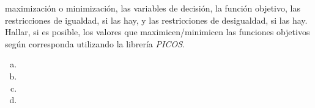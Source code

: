 \documentclass[12pt]{article}
\begin{document}
\begin{center}
\begin{enumerate}
            maximización o minimización, las variables de decisión, la función objetivo, las
            restricciones de igualdad, si las hay, y las restricciones de desigualdad, si las hay. 
            Hallar, si es posible, los valores que maximicen/minimicen las funciones objetivos según corresponda
            utilizando la librería \emph{PICOS}.
            \begin{enumerate}[a)]
                \item 
                \item 
                    \item 

                    \item 
            \end{enumerate}
        \end{enumerate}


    \end{center}
\end{document}
